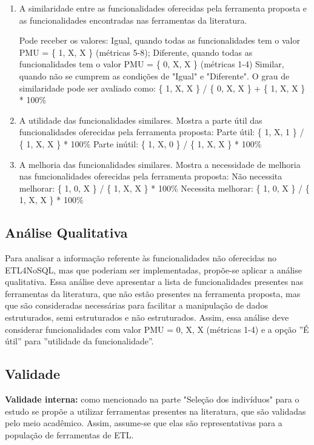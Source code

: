 \begin{enumerate}
	\item A similaridade entre as funcionalidades oferecidas pela ferramenta proposta e as funcionalidades encontradas nas ferramentas da literatura.
	
	Pode receber os valores: Igual, quando todas as funcionalidades tem o valor PMU = \{ 1, X, X \} (métricas 5-8);
	Diferente, quando todas as funcionalidades tem o valor PMU = \{ 0, X, X \} (métricas 1-4)
	Similar, quando não se cumprem as condições de "Igual" e "Diferente". O grau de similaridade pode ser avaliado como:
	\{ 1, X, X \} / \{ 0, X, X \} + \{ 1, X, X \} * 100\%
	
	\item A utilidade das funcionalidades similares. Mostra a parte útil das funcionalidades oferecidas pela ferramenta proposta:
	Parte útil: \{ 1, X, 1 \} / \{ 1, X, X \} * 100\%
	Parte inútil: \{ 1, X, 0 \} / \{ 1, X, X \} * 100\%
	
	\item A melhoria das funcionalidades similares. Mostra a necessidade de melhoria nas funcionalidades oferecidas pela ferramenta proposta:
	Não necessita melhorar: \{ 1, 0, X \} / \{ 1, X, X \} * 100\%
	Necessita melhorar: \{ 1, 0, X \} / \{ 1, X, X \} * 100\%
\end{enumerate}

\subsection{Análise Qualitativa}

Para analisar a informação referente às funcionalidades não oferecidas no ETL4NoSQL, mas que poderiam ser implementadas, propõe-se aplicar a análise qualitativa. Essa análise deve apresentar a lista de funcionalidades presentes nas ferramentas da literatura, que não estão presentes na ferramenta proposta, mas que são consideradas necessárias para facilitar a manipulação de dados estruturados, semi estruturados e não estruturados.
Assim, essa análise deve considerar funcionalidades com valor PMU = {0, X, X} (métricas 1-4) e a opção ''É útil'' para ''utilidade da funcionalidade''.

\subsection{Validade}

\textbf{Validade interna:} como mencionado na parte "Seleção dos indivíduos" para o estudo se propõe a utilizar ferramentas presentes na literatura, que são validadas pelo meio acadêmico. Assim, assume-se que elas são representativas para a população de ferramentas de ETL.

